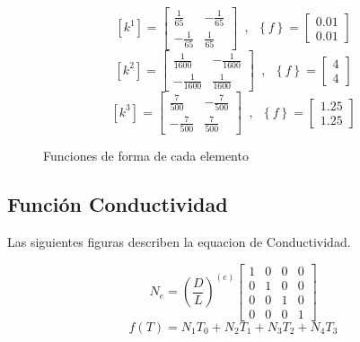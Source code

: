 \documentclass{article}
\begin{document}
\begin{figure}[!h]
    \begin{equation}
        \left [ k^{1} \right ]= \begin{bmatrix}
        \frac{1}{65} & -\frac{1}{65}\\ 
        -\frac{1}{65} & \frac{1}{65}
        \end{bmatrix}\phantom{a},\phantom{a}
        \left \{ f \right \}=\begin{bmatrix}
        0.01\\0.01
        \end{bmatrix}
    \end{equation}
    \begin{equation}
        \left [ k^{2} \right ]= \begin{bmatrix}
        \frac{1}{1600} & -\frac{1}{1600}\\ 
        -\frac{1}{1600} & \frac{1}{1600}
        \end{bmatrix}\phantom{a},\phantom{a}
        \left \{ f \right \}=\begin{bmatrix}
        4\\4
        \end{bmatrix}
    \end{equation}
    \begin{equation}
        \left [ k^{3} \right ]= \begin{bmatrix}
        \frac{7}{500} & -\frac{7}{500}\\ 
        -\frac{7}{500} & \frac{7}{500}
        \end{bmatrix}\phantom{a},\phantom{a}
        \left \{ f \right \}=\begin{bmatrix}
        1.25\\1.25
        \end{bmatrix}
    \end{equation}
    \caption{Funciones de forma de cada elemento}
\end{figure}
\newpage
\subsection{Función Conductividad}
Las siguientes figuras describen la equacion de Conductividad.
\begin{figure}[!h]
    \begin{equation}
        N_{e}=
        \left(
            \frac {D}{L}\right) ^{(e)}
        \left[ \begin{array}{cccc}
            1 & 0 & 0 & 0 \\
            0 & 1 & 0 & 0 \\
            0 & 0 & 1 & 0 \\
            0 & 0 & 0 & 1
            \end{array}\right]
    \end{equation}
    \begin{equation}
        f(T) = N_{1} T_{0} + N_{2} T_{1} + N_{3} T_{2} + N_{4} T_{3}
    \end{equation}
\end{figure}
\end{document}
